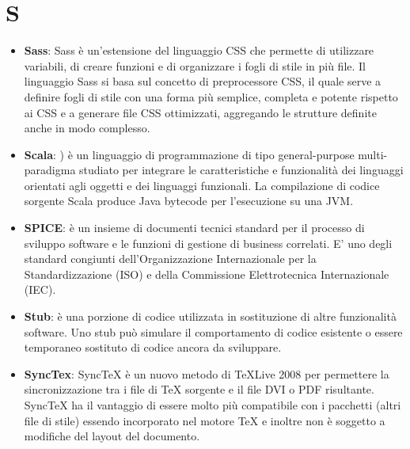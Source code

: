 \section{S}
\begin{itemize} 
	\item
	\textbf{Sass}: Sass è un'estensione del linguaggio CSS che permette di utilizzare variabili, di creare funzioni e di organizzare i fogli di stile in più file. Il linguaggio Sass si basa sul concetto di preprocessore CSS, il quale serve a definire fogli di stile con una forma più semplice, completa e potente rispetto ai CSS e a generare file CSS ottimizzati, aggregando le strutture definite anche in modo complesso.
	\item
	\textbf{Scala}: ) è un linguaggio di programmazione di tipo general-purpose multi-paradigma studiato per integrare le caratteristiche e funzionalità dei linguaggi orientati agli oggetti e dei linguaggi funzionali. La compilazione di codice sorgente Scala produce Java bytecode per l'esecuzione su una JVM.
	\item
	\textbf{SPICE}: è un insieme di documenti tecnici standard per il processo di sviluppo software e le funzioni di gestione di business correlati. E' uno degli standard congiunti dell'Organizzazione Internazionale per la Standardizzazione (ISO) e della Commissione Elettrotecnica Internazionale (IEC).
	\item
	\textbf{Stub}: è una porzione di codice utilizzata in sostituzione di altre funzionalità software. Uno stub può simulare il comportamento di codice esistente o essere temporaneo sostituto di codice ancora da sviluppare. 
	\item
	\textbf{SyncTex}: SyncTeX è un nuovo metodo di TeXLive 2008 per permettere la sincronizzazione tra i file di TeX sorgente e il file DVI o PDF risultante. SyncTeX ha il vantaggio di essere molto più compatibile con i pacchetti (altri file di stile) essendo incorporato nel motore TeX e inoltre non è soggetto a modifiche del layout del documento.
\end{itemize}